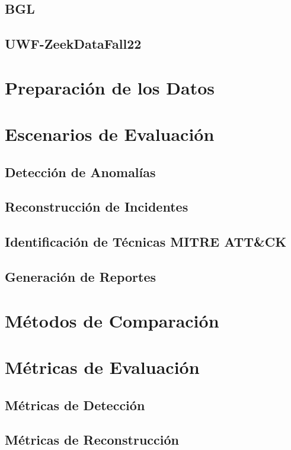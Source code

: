 \subsection{BGL}

\subsection{UWF-ZeekDataFall22}

\section{Preparación de los Datos}

\section{Escenarios de Evaluación}

\subsection{Detección de Anomalías}

\subsection{Reconstrucción de Incidentes}

\subsection{Identificación de Técnicas MITRE ATT\&CK}

\subsection{Generación de Reportes}

\section{Métodos de Comparación}

\section{Métricas de Evaluación}

\subsection{Métricas de Detección}

\subsection{Métricas de Reconstrucción}

